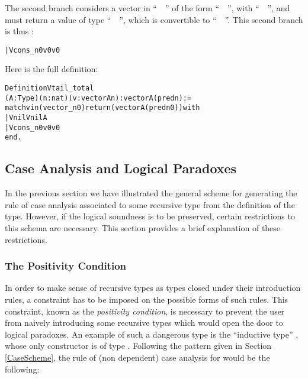 \documentclass[11pt]{article}
\begin{document}
The second branch considers a vector in ``~~''
of the form
``~~'', with ``~~'',
and must return a value of type ``~~'',
which is convertible to ``~~''.
This second branch is thus :
\begin{alltt}
| Vcons _ n0 v0 {\funarrow} v0
\end{alltt}

Here is the full definition:

\begin{alltt}
Definition Vtail_total
   (A : Type) (n : nat) (v : vector A n) : vector A (pred n):=
match v in (vector _ n0) return (vector A (pred n0)) with
| Vnil {\funarrow} Vnil A
| Vcons _ n0 v0 {\funarrow} v0
end.
\end{alltt}


\subsection{Case Analysis and Logical Paradoxes}

In the previous section we have illustrated the general scheme for
generating the rule of case analysis associated to some recursive type
from the definition of the type. However, if the logical soundness is
to be preserved, certain restrictions to this schema are
necessary. This section provides a brief explanation of these
restrictions.


\subsubsection{The Positivity Condition}
\label{postypes}

In order to make sense of recursive types as types closed under their
introduction rules, a constraint has to be imposed on the possible
forms of such rules. This constraint, known as the
\textsl{positivity condition}, is necessary to prevent the user from
naively introducing some recursive types which would open the door to
logical paradoxes.  An example of such a dangerous type is the
``inductive type'' , whose only constructor is
 of type .
 Following the pattern
given in Section \ref{CaseScheme}, the rule of (non dependent) case
analysis for  would be the following:

\begin{center}
         {}
\end{center}
\end{document}
